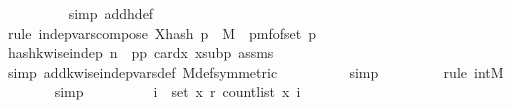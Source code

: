 \begin{isabellebody}
\ \ \ \ \ \ \ \ \isamarkupfalse%
\ {\isacharparenleft}{\kern0pt}simp\ add{\isacharcolon}{\kern0pt}h{\isacharunderscore}{\kern0pt}def{\isacharparenright}{\kern0pt}\isanewline
\ \ \ \ \ \ \ \ \isamarkupfalse%
\ {\isacharparenleft}{\kern0pt}rule\ indep{\isacharunderscore}{\kern0pt}vars{\isacharunderscore}{\kern0pt}compose{}{\isacharbrackleft}{\kern0pt}\ X{\isacharequal}{\kern0pt}{\isachardoublequoteopen}hash\ p{\isachardoublequoteclose}\ \ M{\isacharprime}{\kern0pt}{\isacharequal}{\kern0pt}{\isachardoublequoteopen}\ {\isacharparenleft}{\kern0pt}{\isasymlambda}{\isacharunderscore}{\kern0pt}{\isachardot}{\kern0pt}\ pmf{\isacharunderscore}{\kern0pt}of{\isacharunderscore}{\kern0pt}set\ {\isacharbraceleft}{\kern0pt}{}{\isachardot}{\kern0pt}{\isachardot}{\kern0pt}{\isacharless}{\kern0pt}p{\isacharbraceright}{\kern0pt}{\isacharparenright}{\kern0pt}{\isachardoublequoteclose}{\isacharbrackright}{\kern0pt}{\isacharparenright}{\kern0pt}\isanewline
\ \ \ \ \ \ \ \ \ \isamarkupfalse%
\ hash{\isacharunderscore}{\kern0pt}k{\isacharunderscore}{\kern0pt}wise{\isacharunderscore}{\kern0pt}indep{\isacharbrackleft}{\kern0pt}\ n{\isacharequal}{\kern0pt}{\isachardoublequoteopen}{}{\isachardoublequoteclose}\ \ p{\isacharequal}{\kern0pt}{\isachardoublequoteopen}p{\isachardoublequoteclose}{\isacharbrackright}{\kern0pt}\ card{\isacharunderscore}{\kern0pt}x\ x{\isacharunderscore}{\kern0pt}sub{\isacharunderscore}{\kern0pt}p\ assms{\isacharparenleft}{\kern0pt}{}{\isacharparenright}{\kern0pt}\isanewline
\ \ \ \ \ \ \ \ \ \isamarkupfalse%
\ {\isacharparenleft}{\kern0pt}simp\ add{\isacharcolon}{\kern0pt}k{\isacharunderscore}{\kern0pt}wise{\isacharunderscore}{\kern0pt}indep{\isacharunderscore}{\kern0pt}vars{\isacharunderscore}{\kern0pt}def\ M{\isacharunderscore}{\kern0pt}def{\isacharbrackleft}{\kern0pt}symmetric{\isacharbrackright}{\kern0pt}{\isacharparenright}{\kern0pt}\isanewline
\ \ \ \ \ \ \ \ \isamarkupfalse%
\ simp\isanewline
\ \ \ \ \ \ \ \isamarkupfalse%
\ {\isacharparenleft}{\kern0pt}rule\ int{\isacharunderscore}{\kern0pt}M{\isacharparenright}{\kern0pt}\isanewline
\ \ \ \ \ \ \isamarkupfalse%
\ simp\isanewline
\ \ \ \ \isamarkupfalse%
\ \isamarkupfalse%
\ {\isachardoublequoteopen}{\isachardot}{\kern0pt}{\isachardot}{\kern0pt}{\isachardot}{\kern0pt}\ {\isacharequal}{\kern0pt}\ {\isacharparenleft}{\kern0pt}{\isasymProd}i\ {\isasymin}\ set\ x{\isachardot}{\kern0pt}\ r\ {\isacharparenleft}{\kern0pt}count{\isacharunderscore}{\kern0pt}list\ x\ i{\isacharparenright}{\kern0pt}{\isacharparenright}{\kern0pt}{\isachardoublequoteclose}\isanewline

\end{isabellebody}
